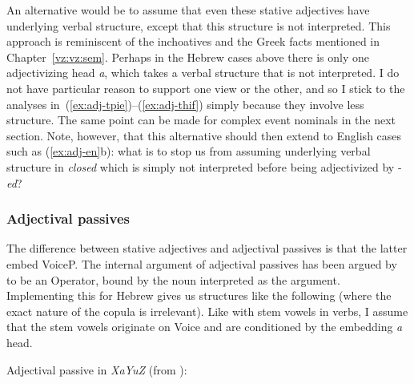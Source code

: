 \begin{exe}
\begin{xlist}
\begin{exe}
\begin{xlist}
\begin{exe}
\begin{exe}
\begin{xlist}
\begin{exe}
\begin{exe}
\begin{xlist}
\begin{exe}
\begin{xlist}
\begin{exe}
\begin{xlist}
\begin{exe}
\begin{xlist}
\begin{exe}
\begin{xlist}
\begin{xlist}
\begin{exe}
\begin{xlist}
\begin{exe}
\begin{xlist}
\begin{exe}
\begin{exe}
\begin{exe}
\begin{xlist}
\begin{exe}
\begin{exe}
\begin{xlist}
\begin{exe}
\begin{xlist}
\begin{exe}
\begin{xlist}
\begin{exe}
\begin{xlist}
\begin{xlist}
\begin{exe}
\begin{xlist}
\begin{exe}
\begin{xlist}
\begin{exe}
\begin{xlist}
\begin{exe}
\begin{xlist}
\begin{exe}
\begin{exe}
\begin{exe}
\begin{exe}
An alternative would be to assume that even these stative adjectives have underlying verbal structure, except that this structure is not interpreted. This approach is reminiscent of the inchoatives and the Greek facts mentioned in Chapter~\ref{vz:vz:sem}. Perhaps in the Hebrew cases above there is only one adjectivizing head \emph{a}, which takes a verbal structure that is not interpreted. I do not have particular reason to support one view or the other, and so I stick to the analyses in~(\ref{ex:adj-tpie})--(\ref{ex:adj-thif}) simply because they involve less structure. The same point can be made for complex event nominals in the next section. Note, however, that this alternative should then extend to English cases such as (\ref{ex:adj-en}b): what is to stop us from assuming underlying verbal structure in \emph{closed} which is simply not interpreted before being adjectivized by -\emph{ed}?

		\subsubsection{Adjectival passives}
The difference between stative adjectives and adjectival passives is that the latter embed VoiceP. The internal argument of adjectival passives has been argued by \citet[386]{bruening14nllt} to be an Operator, bound by the noun interpreted as the argument. Implementing this for Hebrew gives us structures like the following (where the exact nature of the copula is irrelevant). Like with stem vowels in verbs, I assume that the stem vowels originate on Voice and are conditioned by the embedding \emph{a} head.
 \begin{exe}
 \ex \label{ex:adjpass-heb1-tree} Adjectival passive in \emph{XaYuZ} (from {\tkal}): 
 \begin{xlist} 
    

\end{xlist}
\end{exe}
\end{exe}
\end{exe}
\end{exe}
\end{exe}
\end{xlist}
\end{exe}
\end{xlist}
\end{exe}
\end{xlist}
\end{exe}
\end{xlist}
\end{exe}
\end{xlist}
\end{xlist}
\end{exe}
\end{xlist}
\end{exe}
\end{xlist}
\end{exe}
\end{xlist}
\end{exe}
\end{exe}
\end{xlist}
\end{exe}
\end{exe}
\end{exe}
\end{xlist}
\end{exe}
\end{xlist}
\end{exe}
\end{xlist}
\end{xlist}
\end{exe}
\end{xlist}
\end{exe}
\end{xlist}
\end{exe}
\end{xlist}
\end{exe}
\end{xlist}
\end{exe}
\end{exe}
\end{xlist}
\end{exe}
\end{exe}
\end{xlist}
\end{exe}
\end{xlist}
\end{exe}
